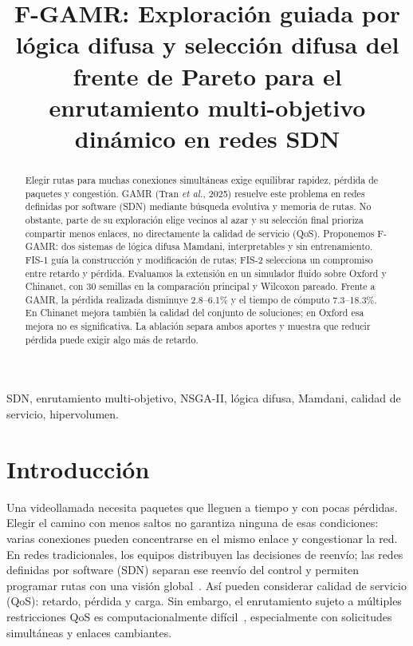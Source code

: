 \documentclass[conference]{IEEEtran}
\begin{document}
\title{F-GAMR: Exploración guiada por lógica difusa y selección difusa del frente de Pareto para el enrutamiento multi-objetivo dinámico en redes SDN}

\author{
}

\maketitle

\begin{abstract}
Elegir rutas para muchas conexiones simultáneas exige equilibrar rapidez, pérdida de paquetes y congestión. GAMR (Tran \textit{et al.}, 2025) resuelve este problema en redes definidas por software (SDN) mediante búsqueda evolutiva y memoria de rutas. No obstante, parte de su exploración elige vecinos al azar y su selección final prioriza compartir menos enlaces, no directamente la calidad de servicio (QoS). Proponemos F-GAMR: dos sistemas de lógica difusa Mamdani, interpretables y sin entrenamiento. FIS-1 guía la construcción y modificación de rutas; FIS-2 selecciona un compromiso entre retardo y pérdida. Evaluamos la extensión en un simulador fluido sobre Oxford y Chinanet, con 30 semillas en la comparación principal y Wilcoxon pareado. Frente a GAMR, la pérdida realizada disminuye 2.8--6.1\% y el tiempo de cómputo 7.3--18.3\%. En Chinanet mejora también la calidad del conjunto de soluciones; en Oxford esa mejora no es significativa. La ablación separa ambos aportes y muestra que reducir pérdida puede exigir algo más de retardo.
\end{abstract}

\begin{IEEEkeywords}
SDN, enrutamiento multi-objetivo, NSGA-II, lógica difusa, Mamdani, calidad de servicio, hipervolumen.
\end{IEEEkeywords}

\section{Introducción}
Una videollamada necesita paquetes que lleguen a tiempo y con pocas pérdidas. Elegir el camino con menos saltos no garantiza ninguna de esas condiciones: varias conexiones pueden concentrarse en el mismo enlace y congestionar la red. En redes tradicionales, los equipos distribuyen las decisiones de reenvío; las redes definidas por software (SDN) separan ese reenvío del control y permiten programar rutas con una visión global~\cite{kreutz2015sdn}. Así pueden considerar calidad de servicio (QoS): retardo, pérdida y carga. Sin embargo, el enrutamiento sujeto a múltiples restricciones QoS es computacionalmente difícil~\cite{wang1996qos}, especialmente con solicitudes simultáneas y enlaces cambiantes.
\end{document}
